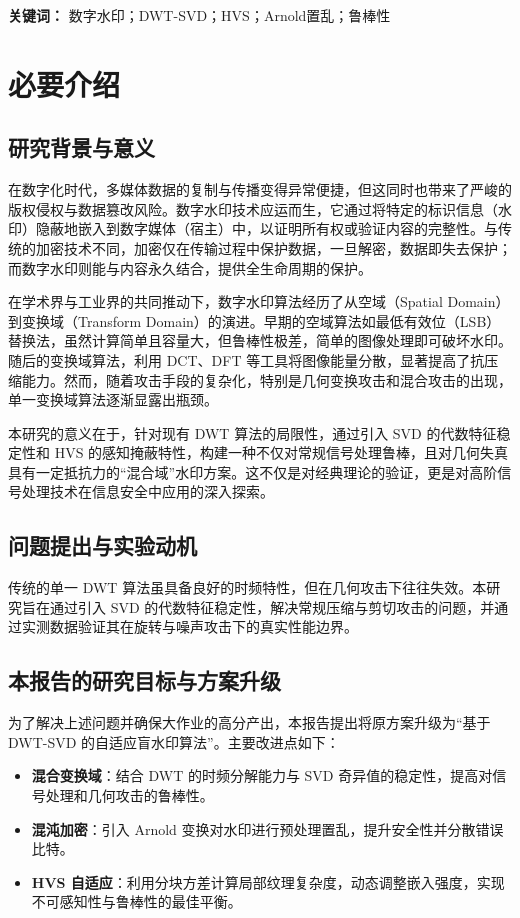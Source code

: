 \documentclass[zihao=-4, a4paper]{ctexart} %
\begin{document}
	\vspace{1em}
	\noindent \textbf{关键词：} 数字水印；DWT-SVD；HVS；Arnold置乱；鲁棒性
	
	
	\section{必要介绍}
	
	\subsection{研究背景与意义}
	在数字化时代，多媒体数据的复制与传播变得异常便捷，但这同时也带来了严峻的版权侵权与数据篡改风险。数字水印技术应运而生，它通过将特定的标识信息（水印）隐蔽地嵌入到数字媒体（宿主）中，以证明所有权或验证内容的完整性。与传统的加密技术不同，加密仅在传输过程中保护数据，一旦解密，数据即失去保护；而数字水印则能与内容永久结合，提供全生命周期的保护。
	
	在学术界与工业界的共同推动下，数字水印算法经历了从空域（Spatial Domain）到变换域（Transform Domain）的演进。早期的空域算法如最低有效位（LSB）替换法，虽然计算简单且容量大，但鲁棒性极差，简单的图像处理即可破坏水印。随后的变换域算法，利用 DCT、DFT 等工具将图像能量分散，显著提高了抗压缩能力。然而，随着攻击手段的复杂化，特别是几何变换攻击和混合攻击的出现，单一变换域算法逐渐显露出瓶颈。
	
	本研究的意义在于，针对现有 DWT 算法的局限性，通过引入 SVD 的代数特征稳定性和 HVS 的感知掩蔽特性，构建一种不仅对常规信号处理鲁棒，且对几何失真具有一定抵抗力的“混合域”水印方案。这不仅是对经典理论的验证，更是对高阶信号处理技术在信息安全中应用的深入探索。
	
	\subsection{问题提出与实验动机}
	传统的单一 DWT 算法虽具备良好的时频特性，但在几何攻击下往往失效。本研究旨在通过引入 SVD 的代数特征稳定性，解决常规压缩与剪切攻击的问题，并通过实测数据验证其在旋转与噪声攻击下的真实性能边界。
	
	\subsection{本报告的研究目标与方案升级}
	为了解决上述问题并确保大作业的高分产出，本报告提出将原方案升级为“基于 DWT-SVD 的自适应盲水印算法”。主要改进点如下：
	\begin{itemize}
		\item \textbf{混合变换域}：结合 DWT 的时频分解能力与 SVD 奇异值的稳定性，提高对信号处理和几何攻击的鲁棒性。
		\item \textbf{混沌加密}：引入 Arnold 变换对水印进行预处理置乱，提升安全性并分散错误比特。
		\item \textbf{HVS 自适应}：利用分块方差计算局部纹理复杂度，动态调整嵌入强度，实现不可感知性与鲁棒性的最佳平衡。
	\end{itemize}
	
\end{document}
